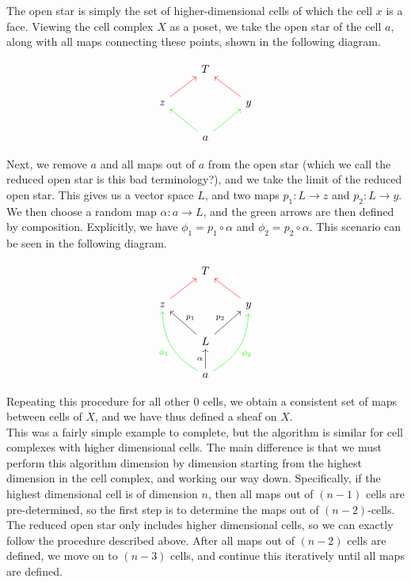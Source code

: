 \documentclass{article}
\newcommand{\clr}{\color{red}}
\theoremstyle{definition}
\begin{document}
The open star is simply the set of higher-dimensional cells of which the cell $x$ is a face. Viewing the cell complex $X$ as a poset, we take the open star of the cell $a$, along with all maps connecting these points, shown in the following diagram.

\[
\begin{tikzcd}
	& T & \\
	z \arrow[red]{ur} &  & y \arrow[red]{ul} \\
	& a \arrow[green]{ul} \arrow[green]{ur} & 
\end{tikzcd}
\]

Next, we remove $a$ and all maps out of $a$ from the open star (which we call the reduced open star {\clr is this bad terminology?}), and we take the limit of the reduced open star. This gives us a vector space $L$, and two maps $p_1 : L \rightarrow z$ and $p_2: L \rightarrow y$. We then choose a random map $\alpha: a \rightarrow L$, and the green arrows are then defined by composition. Explicitly, we have $\phi_1 = p_1 \circ \alpha$ and $\phi_2 = p_2 \circ \alpha$.  This scenario can be seen in the following diagram. 

\[
\begin{tikzcd}
	& T & \\
	z \arrow[red]{ur} &  & y \arrow[red]{ul} \\
	& L \arrow[swap,"p_1"]{ul} \arrow["p_2"]{ur} & \\
	& a \arrow{u}{\alpha} \arrow[green,bend left]{uul}{\phi_1} \arrow[swap, green, bend right,"\phi_2"]{uur} &
\end{tikzcd}	
\]

Repeating this procedure for all other $0$ cells, we obtain a consistent set of maps between cells of $X$, and we have thus defined a sheaf on $X$.\\

This was a fairly simple example to complete, but the algorithm is similar for cell complexes with higher dimensional cells. The main difference is that we must perform this algorithm dimension by dimension starting from the highest dimension in the cell complex, and working our way down. Specifically, if the highest dimensional cell is of dimension $n$, then all maps out of $(n-1)$ cells are pre-determined, so the first step is to determine the maps out of $(n-2)$-cells. The reduced open star only includes higher dimensional cells, so we can exactly follow the procedure described above. After all maps out of $(n-2)$ cells are defined, we move on to $(n-3)$ cells, and continue this iteratively until all maps are defined. \\
\end{document}
